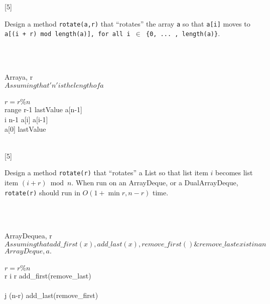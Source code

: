 \documentclass[addpoints]{exam}
\begin{document}
\begin{questions}
	
	Design a method {\tt rotate(a,r)} that ``rotates'' the array {\tt a} so that {\tt a[i]} moves to {\tt a[(i + r) mod length(a)], for all i $\in$ \{0, ... ,  length(a)\}}.
	\begin{solution}\\ \\
		\begin{pseudocode}{Array}{a, r}
			\label{Array}
			\\
			$Assuming that 'n' is the length of \textit{a}$\\ \\
				$r=r\%n$\\
				\FOR range  \TO r-1 \DO 
					\BEGIN
						lastValue \GETS a[n-1]\\
						\FOR i \GETS n-1  \DO
							a[i] \GETS a[i-1]\\
						a[0] \GETS lastValue \\
					\END\\
			\ENDPROCEDURE
		\end{pseudocode}
	\end{solution}
	\pagebreak
	
	
	Design a method {\tt rotate(r)} that ``rotates'' a List so that list item $i$ becomes list item $(i + r) \bmod n$. When run on an ArrayDeque, or a DualArrayDeque, {\tt rotate(r)} should run in $O(1 + \min{r, n-r})$ time.
	\begin{solution}\\ \\
		\begin{pseudocode}{ArrayDeque}{a, r}
			\label{ArrayDeque}
			\\
			$Assuming that add\_first(x), add\_last(x), remove\_first() \& remove\_last exist in an$\\$ArrayDeque, \textit{a}.$\\ \\
				$r=r\%n$\\
				\IF r 
					\THEN 
						\BEGIN
							\FOR i  \TO r \DO 
								add\_first(remove\_last)\\
						\END\\
					\ELSE 
						\BEGIN
							\FOR j  \TO (n-r) \DO 
								add\_last(remove\_first)\\
						\END
			\ENDPROCEDURE
		\end{pseudocode}
	\end{solution}
	\pagebreak
	

\end{questions}
\end{document}
